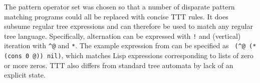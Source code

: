 \documentclass[a4,11pt]{article}
\begin{document}




The pattern operator set was chosen so that a number of disparate pattern matching programs could all be replaced with concise TTT rules. It does subsume regular tree expressions and can therefore be used to match any regular tree language.  Specifically, alternation can be expressed with \texttt{!} and (vertical) iteration with \texttt{\^{}@} and \texttt{*}.  The example expression from \cite{Comon:2007} can be specified as \texttt{ (\^{}@ (* (cons 0 @)) nil)}, which matches Lisp expressions corresponding to lists of zero or more zeros.  TTT also differs from standard tree automata by lack of an explicit state.
\end{document}
